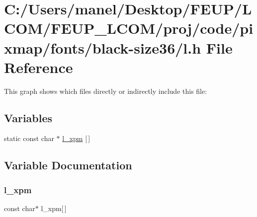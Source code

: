 \hypertarget{black-size36_2l_8h}{}\section{C\+:/\+Users/manel/\+Desktop/\+F\+E\+U\+P/\+L\+C\+O\+M/\+F\+E\+U\+P\+\_\+\+L\+C\+O\+M/proj/code/pixmap/fonts/black-\/size36/l.h File Reference}
\label{black-size36_2l_8h}
This graph shows which files directly or indirectly include this file\+:
\subsection*{Variables}
\begin{DoxyCompactItemize}
\item 
static const char $\ast$ \mbox{\hyperlink{black-size36_2l_8h_a0ed639836f8f6f544d4346049f83e14d}{l\+\_\+xpm}} \mbox{[}$\,$\mbox{]}
\end{DoxyCompactItemize}


\subsection{Variable Documentation}
\mbox{\label{black-size36_2l_8h_a0ed639836f8f6f544d4346049f83e14d}} 
\subsubsection{\texorpdfstring{l\_xpm}{l\_xpm}}
{\footnotesize\ttfamily const char$\ast$ l\+\_\+xpm\mbox{[}$\,$\mbox{]}\hspace{0.3cm}{\ttfamily [static]}}

